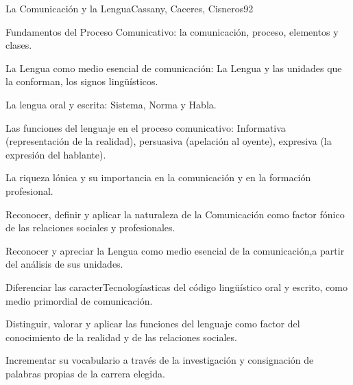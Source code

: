 \begin{syllabus}
\begin{unit}{La Comunicación y la Lengua}{Cassany, Caceres, Cisneros}{9}{2}
\begin{topics}
      \item Fundamentos del Proceso Comunicativo: la comunicación, proceso, elementos y clases. 
      \item La Lengua como medio esencial de comunicación: La Lengua y las unidades que  la conforman, los signos lingüísticos.
      \item La lengua oral y escrita: Sistema, Norma y Habla. 
      \item Las funciones del lenguaje en el proceso comunicativo: Informativa (representación de la realidad), persuasiva (apelación al oyente), expresiva (la expresión del hablante).
      \item La riqueza lónica y su importancia en la comunicación y en la formación profesional.
\end{topics}
\begin{unitgoals}
   \item Reconocer, definir y aplicar la naturaleza de la Comunicación como factor fónico de las relaciones sociales y profesionales.
   \item Reconocer y apreciar la Lengua como medio esencial de la comunicación,a partir del análisis de sus unidades.
   \item Diferenciar las caracterTecnologíasticas del código lingüístico oral y escrito,
   como medio primordial de comunicación.
   \item Distinguir, valorar y aplicar las funciones del lenguaje como factor del conocimiento de la realidad y de las relaciones sociales.
   \item Incrementar su vocabulario a través de la investigación y consignación de palabras propias de la carrera elegida.
\end{unitgoals}

\end{unit}


\end{syllabus}
